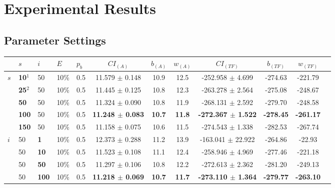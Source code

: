 \chapter{Experimental Results}
\label{appendixC}

\section{Parameter Settings}

\begin{sidewaystable}
    \begin{tabular}{|l|l|l|l|l||c|c|c|c|c|c|c|}
    \hline
    ~ & $s$ & $i$ & $E$ & $p_{b}$ & $CI_{(A)}$ & $b_{(A)}$ & $w_{(A)}$ & $CI_{(TF)}$ & $b_{(TF)}$ & $w_{(TF)}$\\
    \hline
      $s$ & \textbf{10$^1$} & 50 & 10\% & 0.5 & 11.579 $\pm$ 0.148 & 10.9 & 12.5 & -252.958 $\pm$ 4.699& -274.63& -221.79 \\
    ~ & \textbf{25$^2$} & 50 & 10\% & 0.5  & 11.445 $\pm$ 0.125 & 10.8 & 12.3 & -263.278 $\pm$ 2.564 & -275.08 & -248.67  \\
    ~ & \textbf{50} & 50 & 10\% & 0.5  & 11.324 $\pm$ 0.090 & 10.8 & 11.9 & -268.131 $\pm$ 2.592 & -279.70 & -248.58\\
    ~ & \textbf{100} & 50 & 10\% & 0.5 & \textbf{11.248 $\pm$ 0.083} & \textbf{10.7} & \textbf{11.8} & \textbf{-272.367 $\pm$ 1.522} & \textbf{-278.45} & \textbf{-261.17}\\
    ~ & \textbf{150} & 50 & 10\% & 0.5  & 11.158 $\pm$ 0.075 & 10.6 & 11.5 & -274.543 $\pm$ 1.338 & -282.53 & -267.74\\
    \hline
    $i$ & 50 & \textbf{1} & 10\% & 0.5  & 12.373 $\pm$ 0.288 & 11.2 & 13.9& -163.041 $\pm$ 22.922 & -264.86 & -22.93  \\
    ~   & 50 &\textbf{10} & 10\% & 0.5  & 11.523 $\pm$ 0.108 & 11.1 & 12.4 & -258.946 $\pm$ 4.969 & -277.46& -221.18 \\
    ~   & 50 &\textbf{50} & 10\% & 0.5  & 11.297 $\pm$ 0.106 & 10.8 & 12.2 & -272.613 $\pm$ 2.362 & -281.20 & -249.13 \\
    ~   & 50 &\textbf{100} & 10\% & 0.5 & \textbf{11.218 $\pm$ 0.069} & \textbf{10.7} & \textbf{11.7} & \textbf{-273.110 $\pm$ 1.364} & \textbf{-279.77} & \textbf{-263.10} \\

\end{tabular}
\end{sidewaystable}
